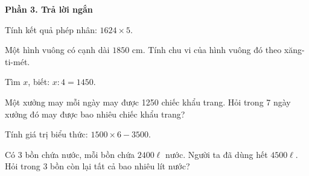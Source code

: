 \textbf{Phần 3. Trả lời ngắn}

\begin{ex} %
Tính kết quả phép nhân: $1624 \times 5$.
\end{ex}

\begin{ex} %
Một hình vuông có cạnh dài $1850\text{ cm}$. Tính chu vi của hình vuông đó theo xăng-ti-mét.
\end{ex}

\begin{ex} %
Tìm $x$, biết: $x : 4 = 1450$.
\end{ex}

\begin{ex} %
Một xưởng may mỗi ngày may được 1250 chiếc khẩu trang. Hỏi trong 7 ngày xưởng đó may được bao nhiêu chiếc khẩu trang?
\end{ex}

\begin{ex} %
Tính giá trị biểu thức: $1500 \times 6 - 3500$.
\end{ex}

\begin{ex} %
Có 3 bồn chứa nước, mỗi bồn chứa $2400\ell$ nước. Người ta đã dùng hết $4500\ell$. Hỏi trong 3 bồn còn lại tất cả bao nhiêu lít nước?
\end{ex}
